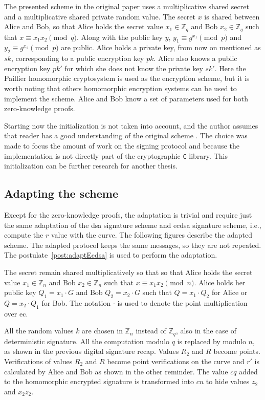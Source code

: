 The presented scheme in the original paper uses a multiplicative shared secret
and a multiplicative shared private random value. The secret $x$ is shared
between Alice and Bob, so that Alice holds the secret value $x_1 \in
\mathbb{Z}_{q}$ and Bob $x_2 \in \mathbb{Z}_{q}$ such that $x \equiv x_1x_2
\pmod q$. Along with the public key $y$, $y_1 \equiv g^{x_1} \pmod p$ and $y_2
\equiv g^{x_2} \pmod p$ are public. Alice holds a private key, from now on
mentioned as $sk$, corresponding to a public encryption key $pk$. Alice also
knows a public encryption key $pk'$ for which she does not know the private key
$sk'$. Here the Paillier homomorphic cryptosystem is used as the encryption
scheme, but it is worth noting that others homomorphic encryption systems can be
used to implement the scheme. Alice and Bob know a set of parameters used for
both zero-knowledge proofs.

Starting now the initialization is not taken into account, and the author
assumes that reader has a good understanding of the original scheme
\cite{crypto-2001-1592}. The choice was made to focus the amount of work on the
signing protocol and because the implementation is not directly part of the
cryptographic \texttt{C} library. This initialization can be further research
for another thesis.

\subsection{Adapting the scheme}

Except for the zero-knowledge proofs, the adaptation is trivial and require just
the same adaptation of the \gls{dsa} signature scheme and \gls{ecdsa} signature
scheme, i.e., compute the $r$ value with the curve. The following figures
describe the adapted scheme. The adapted protocol keeps the same messages, so
they are not repeated. The postulate~\ref{post:adaptEcdsa} is used to perform
the adaptation.

The secret remain shared multiplicatively so that so that Alice holds the secret
value $x_1 \in \mathbb{Z}_{n}$ and Bob $x_2 \in \mathbb{Z}_{n}$ such that $x
\equiv x_1x_2 \pmod n$. Alice holds her public key $Q_1 = x_1 \cdot G$ and Bob
$Q_2 = x_2 \cdot G$ such that $Q = x_1 \cdot Q_2$ for Alice or $Q = x_2 \cdot
Q_1$ for Bob. The notation $\cdot$ is used to denote the point multiplication
over \gls{ec}.

All the random values $k$ are chosen in $\mathbb{Z}_{n}$ instead of
$\mathbb{Z}_{q}$, also in the case of deterministic signature. All the
computation modulo $q$ is replaced by modulo $n$, as shown in the previous
digital signature recap. Values $R_2$ and $R$ become points. Verifications of
values $R_2$ and $R$ become point verifications on the curve and $r'$ is
calculated by Alice and Bob as shown in the other reminder. The value $cq$ added
to the homomorphic encrypted signature is transformed into $cn$ to hide values
$z_2$ and $x_2z_2$.

